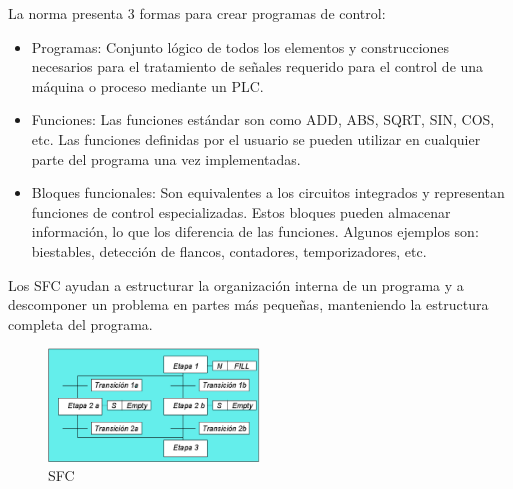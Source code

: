 \documentclass[12pt]{report}
\begin{document}
La norma presenta 3 formas para crear programas de control:
\begin{itemize}
  \item Programas: Conjunto lógico de todos los elementos y construcciones necesarios para el tratamiento de señales requerido para el control de una máquina o proceso mediante un PLC.
  \item Funciones: Las funciones estándar son como ADD, ABS, SQRT, SIN, COS, etc. Las funciones definidas por el usuario se pueden utilizar en cualquier parte del programa una vez implementadas.
  \item Bloques funcionales: Son equivalentes a los circuitos integrados y representan funciones de control especializadas. Estos bloques pueden almacenar información, lo que los diferencia de las funciones. Algunos ejemplos son: biestables, detección de flancos, contadores, temporizadores, etc.
\end{itemize}

Los SFC ayudan a estructurar la organización interna de un programa y a descomponer un problema en partes más pequeñas, manteniendo la estructura completa del programa.
\begin{figure}[h]
  \centering
  \includegraphics[width=0.5\textwidth]{Imagen_2.png}
  \caption{SFC}
  \label{fig:mi_imagen_2}
\end{figure}
\end{document}
